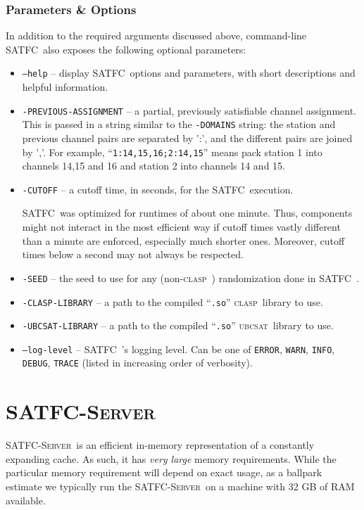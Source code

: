 \documentclass[
10pt, %
letterpaper, %
oneside, %
headinclude,footinclude, %
BCOR5mm, %
needspace, %
]{scrartcl}
\newcommand{\SATFC}{\textsc{SATFC}~}
\newcommand{\SATFCServer}{\textsc{SATFC-Server}~}
\newcommand{\clasp}{\textsc{clasp}~}
\newcommand{\ubcsat}{\textsc{ubcsat}~}
\begin{document}
\subsubsection{Parameters \& Options}
In addition to the required arguments discussed above, command-line \SATFC also exposes the following optional parameters:
\begin{itemize}
\item \texttt{---help} -- display \SATFC options and parameters, with short descriptions and helpful information.
\item \texttt{-PREVIOUS-ASSIGNMENT} -- a partial, previously satisfiable channel assignment. This is passed in a string similar to the \texttt{-DOMAINS} string: the station and previous channel pairs are separated by ':', and the different pairs are joined by ','. For example, ``\texttt{1:14,15,16;2:14,15}'' means pack station 1 into channels 14,15 and 16 and station 2 into channels 14 and 15.
\item \texttt{-CUTOFF} -- a cutoff time, in seconds, for the \SATFC execution. 
\begin{fwarning}
\SATFC was optimized for runtimes of about one minute. Thus, components might not interact in the most efficient way if cutoff times vastly different than a minute are enforced, especially much shorter ones. Moreover, cutoff times below a second may not always be respected.
\end{fwarning}
\item \texttt{-SEED} -- the seed to use for any (non-\clasp) randomization done in \SATFC.
\item \texttt{-CLASP-LIBRARY} -- a path to the compiled ``\texttt{.so}'' \clasp library to use.
\item \texttt{-UBCSAT-LIBRARY} -- a path to the compiled ``\texttt{.so}'' \ubcsat library to use.
\item \texttt{---log-level} -- \SATFC's logging level. Can be one of \texttt{ERROR}, \texttt{WARN}, \texttt{INFO}, \texttt{DEBUG}, \texttt{TRACE} (listed in increasing order of verbosity).
\end{itemize}

\section{\SATFCServer}

\begin{fwarning}
	\SATFCServer is an efficient in-memory representation of a constantly expanding cache. As such, it has \emph{very large} memory requirements. While the particular memory requirement will depend on exact usage, as a ballpark estimate we typically run the \SATFCServer on a machine with 32 GB of RAM available.
\end{fwarning}
\end{document}
